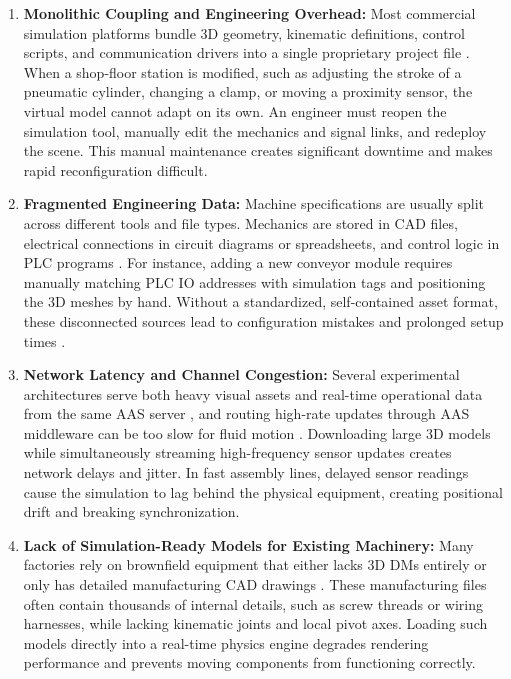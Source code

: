 \begin{enumerate}
    \item \textbf{Monolithic Coupling and Engineering Overhead:} Most commercial simulation platforms bundle 3D geometry, kinematic definitions, control scripts, and communication drivers into a single proprietary project file \cite{Striffler2023}. When a shop-floor station is modified, such as adjusting the stroke of a pneumatic cylinder, changing a clamp, or moving a proximity sensor, the virtual model cannot adapt on its own. An engineer must reopen the simulation tool, manually edit the mechanics and signal links, and redeploy the scene. This manual maintenance creates significant downtime and makes rapid reconfiguration difficult.

    \item \textbf{Fragmented Engineering Data:} Machine specifications are usually split across different tools and file types. Mechanics are stored in \gls{CAD} files, electrical connections in circuit diagrams or spreadsheets, and control logic in \gls{PLC} programs \cite{Luder2020,Ahvanouee2025}. For instance, adding a new conveyor module requires manually matching \gls{PLC} \gls{IO} addresses with simulation tags and positioning the 3D meshes by hand. Without a standardized, self-contained asset format, these disconnected sources lead to configuration mistakes and prolonged setup times \cite{Gollner2022,Schaper2025}.

    \item \textbf{Network Latency and Channel Congestion:} Several experimental architectures serve both heavy visual assets and real-time operational data from the same \gls{AAS} server \cite{Pajpach2023}, and routing high-rate updates through \gls{AAS} middleware can be too slow for fluid motion \cite{Garcia2025}. Downloading large 3D models while simultaneously streaming high-frequency sensor updates creates network delays and jitter. In fast assembly lines, delayed sensor readings cause the simulation to lag behind the physical equipment, creating positional drift and breaking synchronization.

    \item \textbf{Lack of Simulation-Ready Models for Existing Machinery:} Many factories rely on brownfield equipment that either lacks 3D \glspl{DM} entirely or only has detailed manufacturing \gls{CAD} drawings \cite{Lee2014,Striffler2023}. These manufacturing files often contain thousands of internal details, such as screw threads or wiring harnesses, while lacking kinematic joints and local pivot axes. Loading such models directly into a real-time physics engine degrades rendering performance and prevents moving components from functioning correctly.
\end{enumerate}


